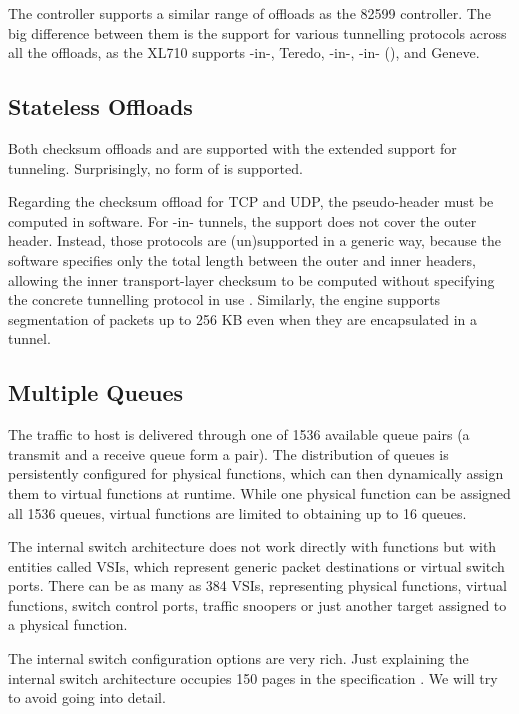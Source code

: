 The controller supports a similar range of offloads as the 82599 controller. The
big difference between them is the support for various tunnelling protocols
across all the offloads, as the XL710 supports -in-, Teredo,
-in-, -in- (),  and Geneve.

\subsection{Stateless Offloads}

Both checksum offloads and  are supported with the extended support for
tunneling. Surprisingly, no form of  is supported.

Regarding the checksum offload for TCP and UDP, the pseudo-header must be
computed in software. For -in- tunnels, the support does not
cover the outer  header. Instead, those protocols are (un)supported in
a generic way, because the software specifies only the total length between
the outer and inner  headers, allowing the inner transport-layer checksum to
be computed without specifying the concrete tunnelling protocol in use
. Similarly, the  engine
supports  segmentation of packets up to 256 KB even when they are
encapsulated in a tunnel.

\subsection{Multiple Queues}

The traffic to host is delivered through one of 1536 available queue pairs
(a transmit and a receive queue form a pair). The distribution of queues is
persistently configured for physical functions, which can then dynamically
assign them to virtual functions at runtime. While one physical function can be
assigned all 1536 queues, virtual functions are limited to obtaining up to 16 queues.

The internal switch architecture does not work directly with functions but with
entities called \glspl{VSI}, which represent generic packet destinations or
virtual switch ports. There can be as many as 384 \glspl{VSI},
representing physical functions, virtual functions, switch control ports,
traffic snoopers or just another target assigned to a physical function.

The internal switch configuration options are very rich. Just explaining the
internal switch architecture occupies 150 pages in the specification
. We will try to avoid going into detail.

